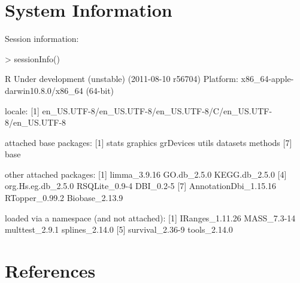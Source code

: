 \documentclass[11pt]{article}
\begin{document}

\section{System Information}
Session information:

\begin{Schunk}
\begin{Sinput}
> sessionInfo()
\end{Sinput}
\begin{Soutput}
R Under development (unstable) (2011-08-10 r56704)
Platform: x86_64-apple-darwin10.8.0/x86_64 (64-bit)

locale:
[1] en_US.UTF-8/en_US.UTF-8/en_US.UTF-8/C/en_US.UTF-8/en_US.UTF-8

attached base packages:
[1] stats     graphics  grDevices utils     datasets  methods  
[7] base     

other attached packages:
[1] limma_3.9.16          GO.db_2.5.0           KEGG.db_2.5.0        
[4] org.Hs.eg.db_2.5.0    RSQLite_0.9-4         DBI_0.2-5            
[7] AnnotationDbi_1.15.16 RTopper_0.99.2        Biobase_2.13.9       

loaded via a namespace (and not attached):
[1] IRanges_1.11.26 MASS_7.3-14     multtest_2.9.1  splines_2.14.0 
[5] survival_2.36-9 tools_2.14.0   
\end{Soutput}
\end{Schunk}

\pagebreak
\section{References}
   
   
\end{document}

